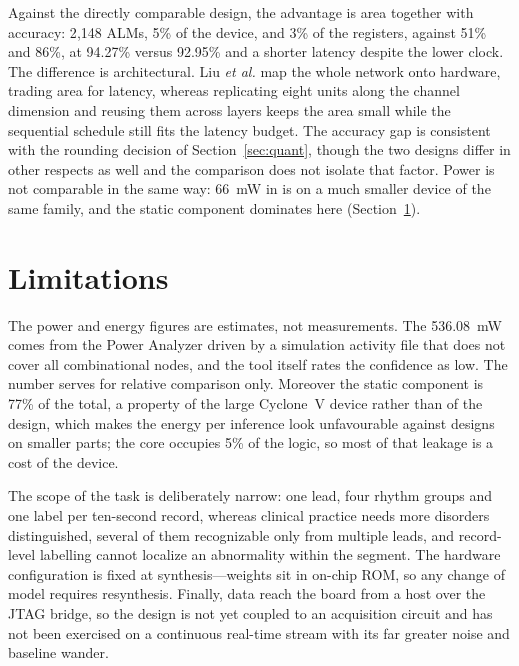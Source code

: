 \documentclass[conference,10pt]{IEEEtran}
\begin{document}
Against the directly comparable design, the advantage is area together with
accuracy: 2{,}148 ALMs, 5\% of the device, and 3\% of the registers, against 51\%
and 86\%, at 94.27\% versus 92.95\% and a shorter latency despite the lower clock.
The difference is architectural. Liu \emph{et al.} map the whole network onto
hardware, trading area for latency, whereas replicating eight units along the
channel dimension and reusing them across layers keeps the area small while the
sequential schedule still fits the latency budget. The accuracy gap is consistent
with the rounding decision of Section~\ref{sec:quant}, though the two designs
differ in other respects as well and the comparison does not isolate that factor.
Power is not comparable in the same way: 66~mW in \cite{liu2023} is on a much
smaller device of the same family, and the static component dominates here
(Section~\ref{sec:limits}).

\section{Limitations}
\label{sec:limits}

The power and energy figures are estimates, not measurements. The 536.08~mW comes
from the Power Analyzer driven by a simulation activity file that does not cover
all combinational nodes, and the tool itself rates the confidence as low. The
number serves for relative comparison only. Moreover the static component is 77\%
of the total, a property of the large Cyclone~V device rather than of the design,
which makes the energy per inference look unfavourable against designs on smaller
parts; the core occupies 5\% of the logic, so most of that leakage is a cost of
the device.

The scope of the task is deliberately narrow: one lead, four rhythm groups and one
label per ten-second record, whereas clinical practice needs more disorders
distinguished, several of them recognizable only from multiple leads, and
record-level labelling cannot localize an abnormality within the segment. The
hardware configuration is fixed at synthesis---weights sit in on-chip ROM, so any
change of model requires resynthesis. Finally, data reach the board from a host
over the JTAG bridge, so the design is not yet coupled to an acquisition circuit
and has not been exercised on a continuous real-time stream with its far greater
noise and baseline wander.
\end{document}
